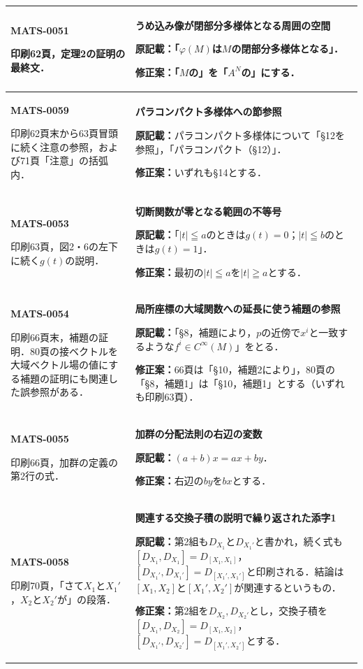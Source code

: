\documentclass[a4paper,10pt]{ltjsarticle}
\begin{document}
\begin{longtable}{@{}>{\raggedright\arraybackslash}p{.19\linewidth}>{\raggedright\arraybackslash}p{.77\linewidth}@{}}
\hline
\hypertarget{MATS-0051}{}\textbf{MATS-0051}\par 印刷62頁，定理2の証明の最終文． & \textbf{うめ込み像が閉部分多様体となる周囲の空間}\par\textbf{原記載：}「$\varphi(M)$は$M$の閉部分多様体となる」．\par\textbf{修正案：}「$M$の」を「$A^N$の」にする． \\[3pt]
\hline
\hypertarget{MATS-0059}{}\textbf{MATS-0059}\par 印刷62頁末から63頁冒頭に続く注意の参照，および71頁「注意」の括弧内． & \textbf{パラコンパクト多様体への節参照}\par\textbf{原記載：}パラコンパクト多様体について「\S12を参照」，「パラコンパクト（\S12）」．\par\textbf{修正案：}いずれも\S14とする． \\[3pt]
\hline
\hypertarget{MATS-0053}{}\textbf{MATS-0053}\par 印刷63頁，図2・6の左下に続く$g(t)$の説明． & \textbf{切断関数が零となる範囲の不等号}\par\textbf{原記載：}「$|t|\leqq a$のときは$g(t)=0$；$|t|\leqq b$のときは$g(t)=1$」．\par\textbf{修正案：}最初の$|t|\leqq a$を$|t|\geqq a$とする． \\[3pt]
\hline
\hypertarget{MATS-0054}{}\textbf{MATS-0054}\par 印刷66頁末，補題の証明．80頁の接ベクトルを大域ベクトル場の値にする補題の証明にも関連した誤参照がある． & \textbf{局所座標の大域関数への延長に使う補題の参照}\par\textbf{原記載：}「\S8，補題により，$p$の近傍で$x^i$と一致するような$f^i\in C^\infty(M)$」をとる．\par\textbf{修正案：}66頁は「\S10，補題2により」，80頁の「\S8，補題1」は「\S10，補題1」とする（いずれも印刷63頁）． \\[3pt]
\hline
\hypertarget{MATS-0055}{}\textbf{MATS-0055}\par 印刷66頁，加群の定義の第2行の式． & \textbf{加群の分配法則の右辺の変数}\par\textbf{原記載：}$(a+b)x=ax+by$．\par\textbf{修正案：}右辺の$by$を$bx$とする． \\[3pt]
\hline
\hypertarget{MATS-0058}{}\textbf{MATS-0058}\par 印刷70頁，「さて$X_1$と$X_1'$，$X_2$と$X_2'$が」の段落． & \textbf{関連する交換子積の説明で繰り返された添字1}\par\textbf{原記載：}第2組も$D_{X_1}$と$D_{X_1'}$と書かれ，続く式も$[D_{X_1},D_{X_1}]=D_{[X_1,X_1]}$，$[D_{X_1'},D_{X_1'}]=D_{[X_1',X_1']}$と印刷される．結論は$[X_1,X_2]$と$[X_1',X_2']$が関連するというもの．\par\textbf{修正案：}第2組を$D_{X_2},D_{X_2'}$とし，交換子積を$[D_{X_1},D_{X_2}]=D_{[X_1,X_2]}$，$[D_{X_1'},D_{X_2'}]=D_{[X_1',X_2']}$とする． \\[3pt]

\end{longtable}
\end{document}

